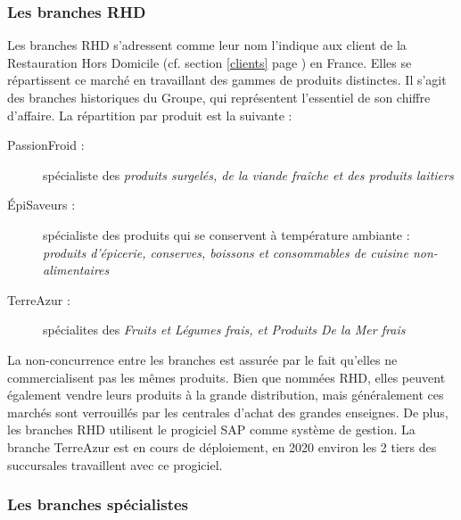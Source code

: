                 \subsubsection{Les branches RHD}
                
                Les branches RHD s'adressent comme leur nom l'indique aux client de la Restauration Hors Domicile (cf. section \ref{clients} page \pageref{clients}) en France.
                Elles se répartissent ce marché en travaillant des gammes de produits distinctes.
                Il s'agit des branches historiques du Groupe, qui représentent l'essentiel de son chiffre d'affaire.
                La répartition par produit est la suivante :
                \begin{description}
                    \item[PassionFroid :] spécialiste des \emph{produits surgelés, de la viande fraîche et des produits laitiers}
                    \item[\'{E}piSaveurs :] spécialiste des produits qui se conservent à température ambiante : \emph{produits d'épicerie, conserves, boissons et consommables de cuisine non-alimentaires}
                    \item[TerreAzur :] spécialites des \emph{Fruits et Légumes frais, et Produits De la Mer frais} 
                \end{description}
                La non-concurrence entre les branches est assurée par le fait qu'elles ne commercialisent pas les mêmes produits.
                Bien que nommées RHD, elles peuvent également vendre leurs produits à la grande distribution, mais généralement ces marchés sont verrouillés par les centrales d'achat des grandes enseignes.
                De plus, les branches RHD utilisent le progiciel SAP comme système de gestion.
                La branche TerreAzur est en cours de déploiement, en 2020 environ les 2 tiers des succursales travaillent avec ce progiciel.

                \subsubsection{Les branches spécialistes}


